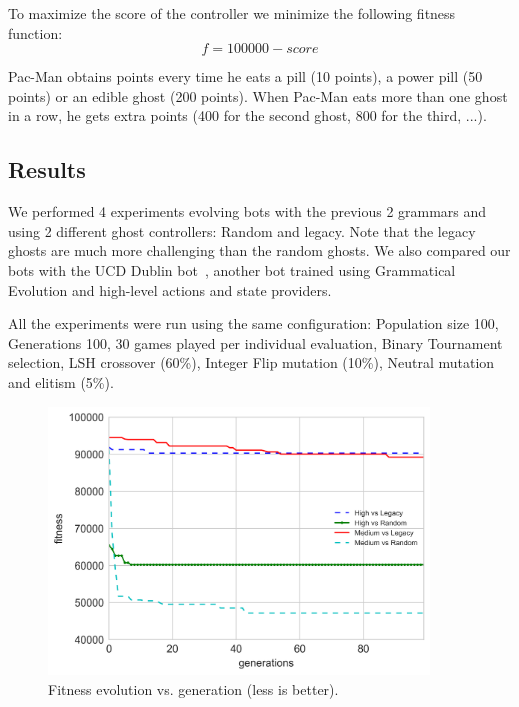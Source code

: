 \documentclass{llncs}
\newcommand{\paco}{Pac-Man }
\begin{document}
To maximize the score of the controller we minimize the following fitness function:
\begin{equation*} %
f = 100000 - score
\end{equation*}

\paco obtains points every time he eats a pill (10 points), a power pill (50 points) or an edible ghost (200 points). When \paco eats more than one ghost in a row, he gets extra points (400 for the second ghost, 800 for the third, ...).

\subsection{Results}

We performed 4 experiments evolving bots with the previous 2 grammars and using 2 different ghost controllers: Random and legacy. Note that the legacy ghosts are much more challenging than the random ghosts. We also compared our bots with the UCD Dublin bot~\cite{galvan2010evolving}, another bot trained using Grammatical Evolution and high-level actions and state providers.

All the experiments were run using the same configuration: Population size 100, Generations 100, 30 games played per individual evaluation, Binary Tournament selection, LSH crossover (60\%), Integer Flip mutation (10\%), Neutral mutation and elitism (5\%).


\begin{figure}[tb]
   \centering
    \includegraphics[width=0.9\textwidth]{so_fitness_bests}
    \caption{Fitness evolution vs. generation (less is better).}
    \label{fig:fitness}
\end{figure}
\end{document}
